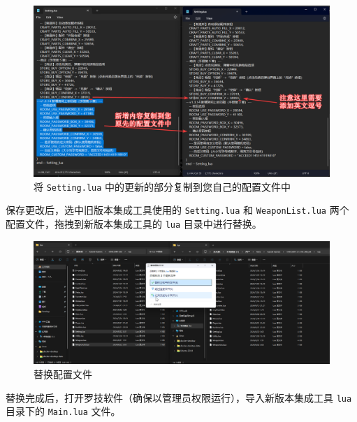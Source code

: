 \begin{figure}[H]
    \Centering
    \includegraphics[width=\textwidth]{docs/assets/update/replace_02.png}
    \caption{将 \lstinline{Setting.lua} 中的更新的部分复制到您自己的配置文件中}
\end{figure}

保存更改后，选中旧版本集成工具使用的 \lstinline{Setting.lua} 和 \lstinline{WeaponList.lua} 两个配置文件，拖拽到新版本集成工具的 \lstinline{lua} 目录中进行替换。

\begin{figure}[H]
    \Centering
    \includegraphics[width=\textwidth]{docs/assets/update/replace_03.png}
    \caption{替换配置文件}
\end{figure}

替换完成后，打开罗技软件（确保以管理员权限运行），导入新版本集成工具 \lstinline{lua} 目录下的 \lstinline{Main.lua} 文件。

